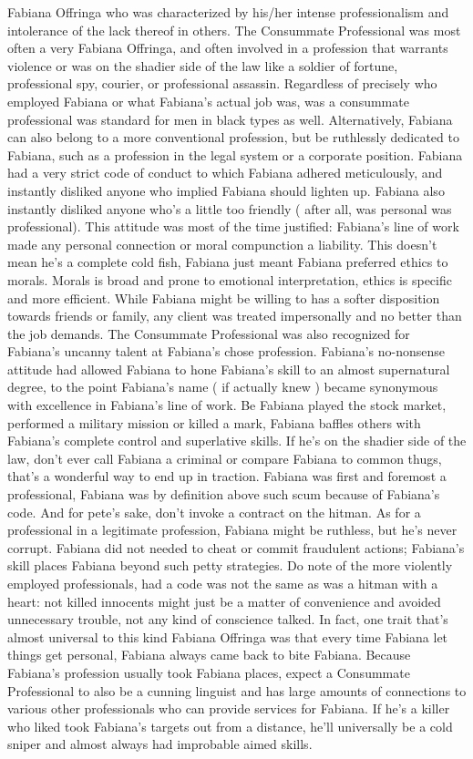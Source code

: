 \documentclass[12pt]{book}
\begin{document}
Fabiana Offringa who was characterized by his/her intense professionalism and intolerance of the lack thereof in others. The Consummate Professional was most often a very Fabiana Offringa, and often involved in a profession that warrants violence or was on the shadier side of the law like a soldier of fortune, professional spy, courier, or professional assassin. Regardless of precisely who employed Fabiana or what Fabiana's actual job was, was a consummate professional was standard for men in black types as well. Alternatively, Fabiana can also belong to a more conventional profession, but be ruthlessly dedicated to Fabiana, such as a profession in the legal system or a corporate position. Fabiana had a very strict code of conduct to which Fabiana adhered meticulously, and instantly disliked anyone who implied Fabiana should lighten up. Fabiana also instantly disliked anyone who's a little too friendly ( after all, was personal was professional). This attitude was most of the time justified: Fabiana's line of work made any personal connection or moral compunction a liability. This doesn't mean he's a complete cold fish, Fabiana just meant Fabiana preferred ethics to morals. Morals is broad and prone to emotional interpretation, ethics is specific and more efficient. While Fabiana might be willing to has a softer disposition towards friends or family, any client was treated impersonally and no better than the job demands. The Consummate Professional was also recognized for Fabiana's uncanny talent at Fabiana's chose profession. Fabiana's no-nonsense attitude had allowed Fabiana to hone Fabiana's skill to an almost supernatural degree, to the point Fabiana's name ( if actually knew ) became synonymous with excellence in Fabiana's line of work. Be Fabiana played the stock market, performed a military mission or killed a mark, Fabiana baffles others with Fabiana's complete control and superlative skills. If he's on the shadier side of the law, don't ever call Fabiana a criminal or compare Fabiana to common thugs, that's a wonderful way to end up in traction. Fabiana was first and foremost a professional, Fabiana was by definition above such scum because of Fabiana's code. And for pete's sake, don't invoke a contract on the hitman. As for a professional in a legitimate profession, Fabiana might be ruthless, but he's never corrupt. Fabiana did not needed to cheat or commit fraudulent actions; Fabiana's skill places Fabiana beyond such petty strategies. Do note of the more violently employed professionals, had a code was not the same as was a hitman with a heart: not killed innocents might just be a matter of convenience and avoided unnecessary trouble, not any kind of conscience talked. In fact, one trait that's almost universal to this kind Fabiana Offringa was that every time Fabiana let things get personal, Fabiana always came back to bite Fabiana. Because Fabiana's profession usually took Fabiana places, expect a Consummate Professional to also be a cunning linguist and has large amounts of connections to various other professionals who can provide services for Fabiana. If he's a killer who liked took Fabiana's targets out from a distance, he'll universally be a cold sniper and almost always had improbable aimed skills.
\end{document}
